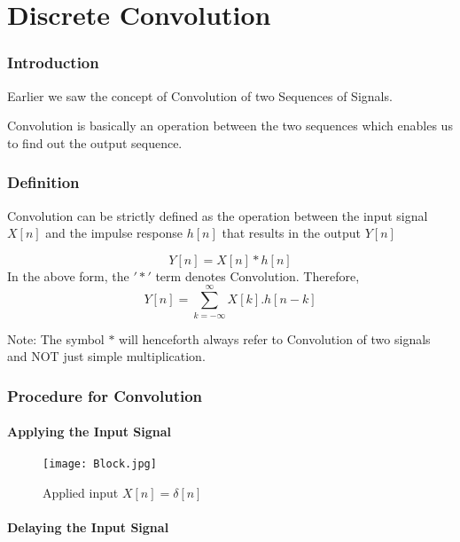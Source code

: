 \pagebreak
\chapter{Discrete Convolution}

\setcounter{section}{0}

\subsection{Introduction}

Earlier we saw the concept of Convolution of two Sequences of Signals. 

Convolution is basically an operation between the two sequences which enables us to find out the output sequence. 

\subsection{Definition}
Convolution can be strictly defined as the operation between the input signal $X[n]$ and the impulse response $h[n]$ that results in the output $Y[n]$

$$Y[n]=X[n]*h[n]$$
In the above form, the $'*'$ term denotes Convolution. 
Therefore, $$Y[n]=\sum_{k=-\infty}^{\infty} X[k].h[n-k]$$


Note: The symbol $*$ will henceforth always refer to Convolution of two signals and NOT just simple multiplication.

\subsection{Procedure for Convolution}
\subsubsection{Applying the Input Signal}

\begin{figure}[ht]
\centering
\texttt{[image: Block.jpg]}
\caption{\label{Step 1:} Applied input $X[n]=\delta[n]$}
\end{figure}


\subsubsection{Delaying the Input Signal}

